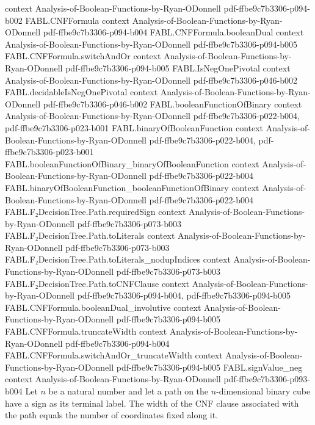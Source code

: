 \begin{theorem}
  {context}
  {Analysis-of-Boolean-Functions-by-Ryan-ODonnell}
  {pdf-ffbe9c7b3306-p094-b002}
\proofstep
  {FABL.CNFFormula}
  {context}
  {Analysis-of-Boolean-Functions-by-Ryan-ODonnell}
  {pdf-ffbe9c7b3306-p094-b004}
\proofstep
  {FABL.CNFFormula.booleanDual}
  {context}
  {Analysis-of-Boolean-Functions-by-Ryan-ODonnell}
  {pdf-ffbe9c7b3306-p094-b005}
\proofstep
  {FABL.CNFFormula.switchAndOr}
  {context}
  {Analysis-of-Boolean-Functions-by-Ryan-ODonnell}
  {pdf-ffbe9c7b3306-p094-b005}
\proofstep
  {FABL.IsNegOnePivotal}
  {context}
  {Analysis-of-Boolean-Functions-by-Ryan-ODonnell}
  {pdf-ffbe9c7b3306-p046-b002}
\proofstep
  {FABL.decidableIsNegOnePivotal}
  {context}
  {Analysis-of-Boolean-Functions-by-Ryan-ODonnell}
  {pdf-ffbe9c7b3306-p046-b002}
\proofstep
  {FABL.booleanFunctionOfBinary}
  {context}
  {Analysis-of-Boolean-Functions-by-Ryan-ODonnell}
  {pdf-ffbe9c7b3306-p022-b004,
    pdf-ffbe9c7b3306-p023-b001}
\proofstep
  {FABL.binaryOfBooleanFunction}
  {context}
  {Analysis-of-Boolean-Functions-by-Ryan-ODonnell}
  {pdf-ffbe9c7b3306-p022-b004,
    pdf-ffbe9c7b3306-p023-b001}
\proofstep
  {FABL.booleanFunctionOfBinary_binaryOfBooleanFunction}
  {context}
  {Analysis-of-Boolean-Functions-by-Ryan-ODonnell}
  {pdf-ffbe9c7b3306-p022-b004}
\proofstep
  {FABL.binaryOfBooleanFunction_booleanFunctionOfBinary}
  {context}
  {Analysis-of-Boolean-Functions-by-Ryan-ODonnell}
  {pdf-ffbe9c7b3306-p022-b004}
\proofstep
  {FABL.F₂DecisionTree.Path.requiredSign}
  {context}
  {Analysis-of-Boolean-Functions-by-Ryan-ODonnell}
  {pdf-ffbe9c7b3306-p073-b003}
\proofstep
  {FABL.F₂DecisionTree.Path.toLiterals}
  {context}
  {Analysis-of-Boolean-Functions-by-Ryan-ODonnell}
  {pdf-ffbe9c7b3306-p073-b003}
\proofstep
  {FABL.F₂DecisionTree.Path.toLiterals_nodupIndices}
  {context}
  {Analysis-of-Boolean-Functions-by-Ryan-ODonnell}
  {pdf-ffbe9c7b3306-p073-b003}
\proofstep
  {FABL.F₂DecisionTree.Path.toCNFClause}
  {context}
  {Analysis-of-Boolean-Functions-by-Ryan-ODonnell}
  {pdf-ffbe9c7b3306-p094-b004,
    pdf-ffbe9c7b3306-p094-b005}
\proofstep
  {FABL.CNFFormula.booleanDual_involutive}
  {context}
  {Analysis-of-Boolean-Functions-by-Ryan-ODonnell}
  {pdf-ffbe9c7b3306-p094-b005}
\proofstep
  {FABL.CNFFormula.truncateWidth}
  {context}
  {Analysis-of-Boolean-Functions-by-Ryan-ODonnell}
  {pdf-ffbe9c7b3306-p094-b004}
\proofstep
  {FABL.CNFFormula.switchAndOr_truncateWidth}
  {context}
  {Analysis-of-Boolean-Functions-by-Ryan-ODonnell}
  {pdf-ffbe9c7b3306-p094-b005}
\proofstep
  {FABL.signValue_neg}
  {context}
  {Analysis-of-Boolean-Functions-by-Ryan-ODonnell}
  {pdf-ffbe9c7b3306-p093-b004}
Let $n$ be a natural number and let a path on the $n$-dimensional binary cube have a
sign as its terminal label. The width of the CNF clause associated with the path equals
the number of coordinates fixed along it.
\end{theorem}

